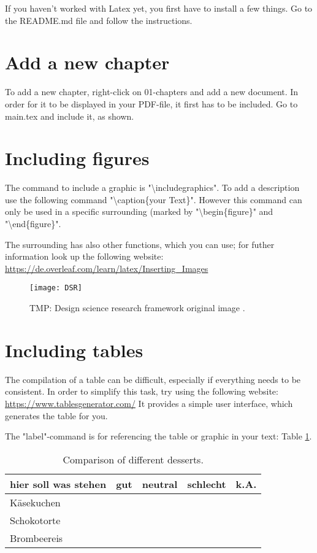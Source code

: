 If you haven't worked with Latex yet, you first have to install a few things. Go to the README.md file and follow the instructions.

\section{Add a new chapter}

To add a new chapter, right-click on 01-chapters and add a new document. In order for it to be displayed in your PDF-file, it first has to be included. Go to main.tex and include it, as shown.


\section{Including figures}

The command to include a graphic is "\textbackslash includegraphics". To add a description use the following command "\textbackslash caption\{your Text\}". However this command can only be used in a specific surrounding (marked by "\textbackslash begin\{figure\}" and "\textbackslash end\{figure\}".

The surrounding has also other functions, which you can use; for futher information look up the following website: \url{https://de.overleaf.com/learn/latex/Inserting_Images}


\begin{figure}[ht]
	\centering
	\texttt{[image: DSR]}
	\caption{TMP: Design science research framework original image \cite[based on][p. 80]{khalil_transmissibility-based_2022}.}
	\label{fig:DSR}
\end{figure}



\section{Including tables}

The compilation of a table can be difficult, especially if everything needs to be consistent. In order to simplify this task, try using the following website: \url{https://www.tablesgenerator.com/}
It provides a simple user interface, which generates the table for you.

The "label"-command is for referencing the table or graphic in your text: Table \ref{desserts}.

\begin{table}[H]
    \caption{Comparison of different desserts.}
    \label{desserts}
    \centering
    \begin{tabular}{@{}lllll@{}}
        \toprule
        hier soll was stehen & gut & neutral & schlecht & k.A. \\ \midrule
        Käsekuchen           &     &         &          &      \\
        Schokotorte          &     &         &          &      \\
        Brombeereis          &     &         &          &      \\ \bottomrule
    \end{tabular}
\end{table}



